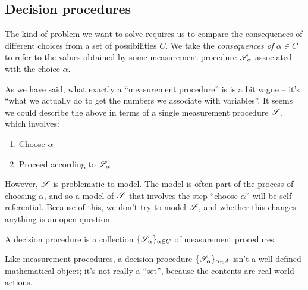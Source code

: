\subsection{Decision procedures}\label{sec:actions}

The kind of problem we want to solve requires us to compare the consequences of different choices from a set of possibilities $C$. We take the \emph{consequences of} $\alpha\in C$ to refer to the values obtained by some measurement procedure $\mathscr{S}_\alpha$ associated with the choice $\alpha$.

As we have said, what exactly a ``measurement procedure'' is is a bit vague -- it's ``what we actually do to get the numbers we associate with variables''. It seems we could describe the above in terms of a single measurement procedure $\mathscr{S}$, which involves:

\begin{enumerate}
    \item Choose $\alpha$
    \item Proceed according to $\mathscr{S}_\alpha$
\end{enumerate}

However, $\mathscr{S}$ is problematic to model. The model is often part of the process of choosing $\alpha$, and so a model of $\mathscr{S}$ that involves the step ``choose $\alpha$'' will be self-referential. Because of this, we don't try to model $\mathscr{S}$, and whether this changes anything is an open question.

\begin{definition}
A decision procedure is a collection $\{\mathscr{S}_\alpha\}_{\alpha\in C}$ of measurement procedures.
\end{definition}

Like measurement procedures, a decision procedure $\{\mathscr{S}_\alpha\}_{\alpha\in A}$ isn't a well-defined mathematical object; it's not really a ``set'', because the contents are real-world actions.